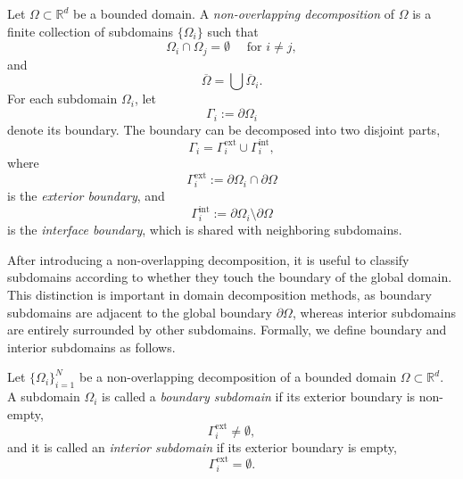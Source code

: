\begin{definition}
Let $\Omega \subset \mathbb{R}^d$ be a bounded domain. A \textit{non-overlapping decomposition} of $\Omega$ is a finite collection of subdomains $\{\Omega_{i}\}$ such that
\begin{equation*}
    \Omega_{i} \cap \Omega_{j} = \emptyset \quad\text{ for } i \neq j,
\end{equation*}
and
\begin{equation*}
    \overline{\Omega} = \bigcup\overline{\Omega}_{i}.
\end{equation*}
For each subdomain $\Omega_i$, let
\begin{equation*}
    \Gamma_{i} := \partial \Omega_i
\end{equation*}
denote its boundary. The boundary can be decomposed into two disjoint parts, 
\begin{equation*}
    \Gamma_{i} = \Gamma_{i}^{\text{ext}} \cup \Gamma_{i}^{\text{int}},
\end{equation*}
where
\begin{equation*}
    \Gamma_{i}^{\text{ext}} := \partial \Omega_i \cap \partial \Omega
\end{equation*}
is the \textit{exterior boundary}, and
\begin{equation*}
    \Gamma_{i}^{\text{int}} := \partial \Omega_{i} \setminus \partial\Omega
\end{equation*}
is the \textit{interface boundary}, which is shared with neighboring subdomains.
\end{definition}
\noindent After introducing a non-overlapping decomposition, it is useful to classify subdomains according to whether they touch the boundary of the global domain. This distinction is important in domain decomposition methods, as boundary subdomains are adjacent to the global boundary $\partial \Omega$, whereas interior subdomains are entirely surrounded by other subdomains. Formally, we define boundary and interior subdomains as follows.
\begin{definition}
Let $\{\Omega_i\}_{i=1}^N$ be a non-overlapping decomposition of a bounded domain $\Omega \subset \mathbb{R}^d$. A subdomain $\Omega_i$ is called a \textit{boundary subdomain} if its exterior boundary is non-empty,
\begin{equation*}
    \Gamma_i^{\text{ext}} \neq \emptyset,
\end{equation*}
and it is called an \textit{interior subdomain} if its exterior boundary is empty,
\begin{equation*}
    \Gamma_i^{\text{ext}} = \emptyset.
\end{equation*}
\end{definition}
